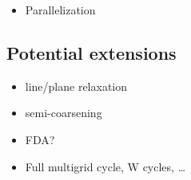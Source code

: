 \documentclass[\mydriver,12pt,twoside,notitlepage,letterpaper]{article}
\begin{document}
\begin{itemize}
\item Parallelization
\end{itemize}

\subsection{Potential extensions}

\begin{itemize}
\item line/plane relaxation
\item semi-coarsening
\item FDA?
\item Full multigrid cycle, W cycles, \ldots
\end{itemize}


\printindex
\end{document}
